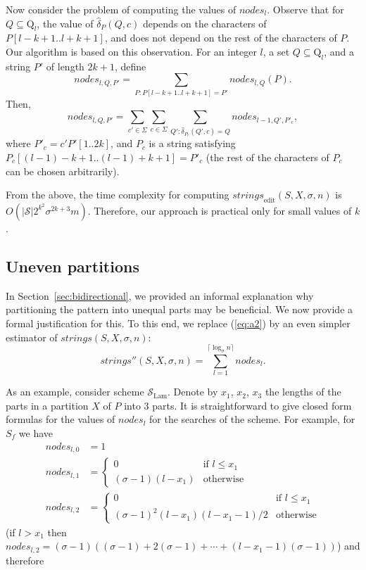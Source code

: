 \documentclass[12pt]{article}
\newcommand{\substr}[3]{#1[#2..#3]}
\newcommand{\scheme}{\mathcal{S}}
\newcommand{\schemelam}{\mathcal{S}_{\text{Lam}}}
\newcommand{\partition}{X}
\newcommand{\numstrings}{\mathit{strings}}
\newcommand{\numnodes}[1]{\mathit{nodes}_{#1}}
\newcommand{\numnodesd}[2]{\mathit{nodes}_{#1,#2}}
\newcommand{\numstringsedit}{\numstrings_{\mathrm{edit}}}
\newcommand{\numnodesqp}[3]{\mathit{nodes}_{#1,#2}(#3)}
\newcommand{\numnodesqpb}[3]{\mathit{nodes}_{#1,#2,#3}}
\newcommand{\transition}[1]{\hat{\delta}_{#1}}
\newcommand{\states}[1]{\mathrm{Q}_{#1}}
\newcommand{\numstringspp}{\numstrings''}
\newif\iffull
\newif\ifextra
\begin{document}
Now consider the problem of computing the values of $\numnodes{l}$.
Observe that for $Q\subseteq \states{l}$, the value of
$\transition{P}(Q,c)$ depends on the characters of $\substr{P}{l-k+1}{l+k+1}$,
and does not depend on the rest of the characters of $P$.
Our algorithm is based on this observation.
For an integer $l$, a set $Q \subseteq \states{l}$, and
a string $P'$ of length $2k+1$, define
\[ \numnodesqpb{l}{Q}{P'} = 
 \sum_{P:\substr{P}{l-k+1}{l+k+1}=P'} \numnodesqp{l}{Q}{P}.
\]
Then,
\[
 \numnodesqpb{l}{Q}{P'} = \sum_{c'\in \Sigma} \sum_{c\in \Sigma}
 \sum_{Q': \transition{P_c}(Q',c)=Q} \numnodesqpb{l-1}{Q'}{P'_c},
\]
where $P'_c = c'\substr{P'}{1}{2k}$, and
$P_c$ is a string satisfying $\substr{P_c}{(l-1)-k+1}{(l-1)+k+1} = P'_c$
(the rest of the characters of $P_c$ can be chosen arbitrarily).

From the above, the time complexity for computing
$\numstringsedit(S,\partition,\sigma,n)$ is
$O(|\scheme| 2^{k^2}\sigma^{2k+3} m)$.
Therefore, our approach is practical only for small values of $k$.

\iffull
\subsection{Uneven partitions}\label{sec:uneven}
In Section~\ref{sec:bidirectional}, we provided an informal explanation why
partitioning the pattern into unequal parts may be beneficial. 
We now provide a formal justification for this. 
To this end, we replace (\ref{eq:a2}) by an even simpler estimator of
$\numstrings(S,\partition,\sigma,n)$:
\begin{equation}
\numstringspp(S,\partition,\sigma,n) = \sum_{l = 1}^{\lceil\log_{\sigma}
n\rceil} \numnodes{l}.
\end{equation}

As an example, consider scheme $\schemelam$.
Denote by $x_1$, $x_2$, $x_3$ the lengths of the parts
in a partition $\partition$ of $P$ into 3 parts.
\ifextra
It is straightforward to give closed form formulas for the values of 
$\numnodes{l}$ for the searches of the scheme.
For example, for $S_f$ we have
\begin{align*}
\numnodesd{l}{0} &= 1 \\
\numnodesd{l}{1} &= \begin{cases}
0 & \text{if }l \leq x_1 \\
(\sigma-1)(l-x_1) & \text{otherwise}
\end{cases}\\
\numnodesd{l}{2} &= \begin{cases}
0 & \text{if }l \leq x_1 \\
(\sigma-1)^2 (l-x_1)(l-x_1-1)/2 & \text{otherwise}
\end{cases}
\end{align*}
(if $l > x_1$ then $\numnodesd{l}{2}
 =(\sigma-1)((\sigma-1)+2(\sigma-1)+\cdots+(l-x_1-1)(\sigma-1))$)
and therefore
\end{document}
